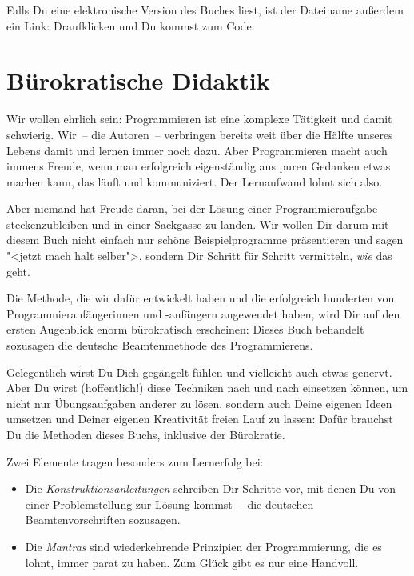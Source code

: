 \smallskip

%
Falls Du eine elektronische Version des Buches liest, ist der
Dateiname außerdem ein Link: Draufklicken und Du kommst zum Code.

\section{Bürokratische Didaktik}

Wir wollen ehrlich sein: Programmieren ist eine komplexe Tätigkeit und
damit schwierig.  Wir~-- die Autoren~-- verbringen bereits weit über
die Hälfte unseres Lebens damit und lernen immer noch dazu.  Aber
Programmieren macht auch immens Freude, wenn man erfolgreich
eigenständig aus puren Gedanken etwas machen kann, das läuft und
kommuniziert.  Der Lernaufwand lohnt sich also.

Aber niemand hat Freude daran, bei der Lösung einer Programmieraufgabe
steckenzubleiben und in einer Sackgasse zu landen.  Wir wollen Dir
darum mit diesem Buch nicht einfach nur schöne Beispielprogramme
präsentieren und sagen "<jetzt mach halt selber">, sondern Dir Schritt
für Schritt vermitteln, \emph{wie} das geht.

Die Methode, die wir dafür entwickelt haben und die erfolgreich
hunderten von Programmieranfängerinnen und -anfängern angewendet
haben, wird Dir auf den ersten Augenblick enorm bürokratisch
erscheinen: Dieses Buch behandelt sozusagen die deutsche
Beamtenmethode des Programmierens.

Gelegentlich wirst Du Dich gegängelt fühlen und vielleicht auch etwas
genervt.  Aber Du wirst (hoffentlich!) diese Techniken nach und nach
einsetzen können, um nicht nur Übungsaufgaben anderer zu lösen, sondern
auch Deine eigenen Ideen umsetzen und Deiner eigenen Kreativität freien Lauf zu
lassen: Dafür brauchst Du die Methoden dieses Buchs, inklusive der
Bürokratie.

Zwei Elemente tragen besonders zum Lernerfolg bei:
%
\begin{itemize}
\item Die \textit{Konstruktionsanleitungen} schreiben Dir Schritte
  vor, mit denen Du von einer Problemstellung zur Lösung kommst~-- die
  deutschen Beamtenvorschriften sozusagen.
\item Die \textit{Mantras} sind wiederkehrende Prinzipien der
  Programmierung, die es lohnt, immer parat zu haben.  Zum Glück gibt
  es nur eine Handvoll.
\end{itemize}
%



